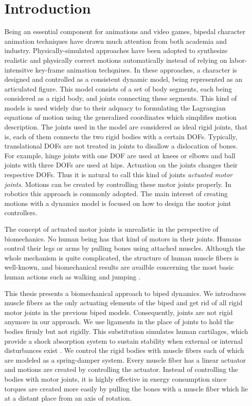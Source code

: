 \documentclass{acm_proc_article-sp}
\begin{document}
\section{Introduction}
Being an essential component for animations and video games,
bipedal character animation techniques have drawn much attention from
both academia and industry. Physically-simulated approaches have been
adopted to synthesize realistic and physically correct motions
automatically instead of relying on labor-intensitve key-frame animation
techqniues. In these approaches, a character is designed and controlled
as a consistent dynamic model, being represented as an articulated
figure. This model consists of a set of body segments, each being
considered as a rigid body, and joints connecting these segments.
This kind of models is used widely due to their adquacy to formulating
the Lagrangian equations of motion using the generalized coordinates
which simplifies motion description.
The joints used in the model are considered as ideal rigid joints,
that is, each of them connects the two rigid bodies with a certain DOFs.
Typically, translational DOFs are not treated in joints to disallow a dislocation of bones.
For example, hinge joints with one DOF are used at knees or elbows and
ball joints with three DOFs are used at hips. Actuation on the joints
changes their respective DOFs. Thus it is natural to call this kind of joints
\emph{actuated motor joints}. Motions can be created by
controlling these motor joints properly. In robotics this approach is
commonly adopted. The main interest of creating motions
with a dynamics model is focused on how to design the motor joint controllers.

The concept of actuated motor joints is unrealistic in the perspective of
biomechanics. No human being has that kind of motors in their joints.
Humans control their legs or arms by pulling bones using attached
muscles. Although the whole mechanism is quite complicated,
the structure of human muscle fibers is well-known, and biomechanical
results are availble concerning the most basic human actions
such as walking and jumping \cite{citeulike:2547705, citeulike:7093575}.

This thesis presents a biomechanical approach to biped dynamics. We
introduces muscle fibers as the only actuating elements
of the biped and get rid of all rigid motor joints in the previous biped
models. Consequently, joints are not rigid anymore in our approach.
We use ligaments in the place of joints
to hold the bodies firmly but not rigidly. This substitution
simulates human cartilages, which provide a shock absorption
system to sustain stability when external or internal disturbances exist \cite{shock}.
We control the rigid bodies with muscle fibers each of which are modeled as
a spring-damper system. Every muscle fiber has a linear actuator and
motions are created by controlling the actuator. Instead of controlling
the bodies with motor joints, it is highly effective in energy consumption
since torques are created more easily by pulling the bones with a muscle
fiber which lie at a distant place from an axis of rotation.
\end{document}
